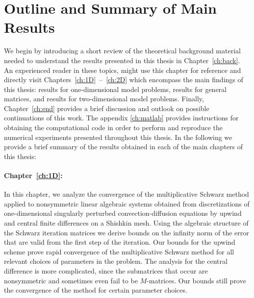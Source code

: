 %
%

\section{Outline and Summary of Main Results}

We begin by introducing a short review of the theoretical background material
needed to understand the results presented in this thesis in
Chapter~\ref{ch:back}. An experienced reader in these topics, might use this
chapter for reference and directly visit Chapters~\ref{ch:1D}~--~\ref{ch:2D} which encompass the main findings of this thesis: results for
one-dimensional model problems, results for general matrices, and results for
two-dimensional model problems. Finally, Chapter~\ref{ch:end} provides a
brief discussion and outlook on possible continuations of this work. The
appendix \ref{ch:matlab} provides instructions for obtaining the computational
code in order to perform and reproduce the numerical experiments presented
throughout this thesis. In the following we provide a brief summary of the
results obtained in each of the main chapters of this thesis:
%
\paragraph{Chapter~\ref{ch:1D}:} In this chapter, we analyze the
convergence of the multiplicative Schwarz method applied to nonsymmetric linear
algebraic systems obtained from discretizations of one-dimensional singularly
perturbed convection-diffusion equations by upwind and central finite
differences on a Shishkin mesh. Using the algebraic structure of the Schwarz
iteration matrices we derive bounds on the infinity norm of the error that are
valid from the first step of the iteration. Our bounds for the upwind scheme
prove rapid convergence of the multiplicative Schwarz method for all relevant
choices of parameters in the problem. The analysis for the central difference
is more complicated, since the submatrices that occur are nonsymmetric and
sometimes even fail to be $M$-matrices. Our bounds still prove the convergence
of the method for certain parameter choices.


